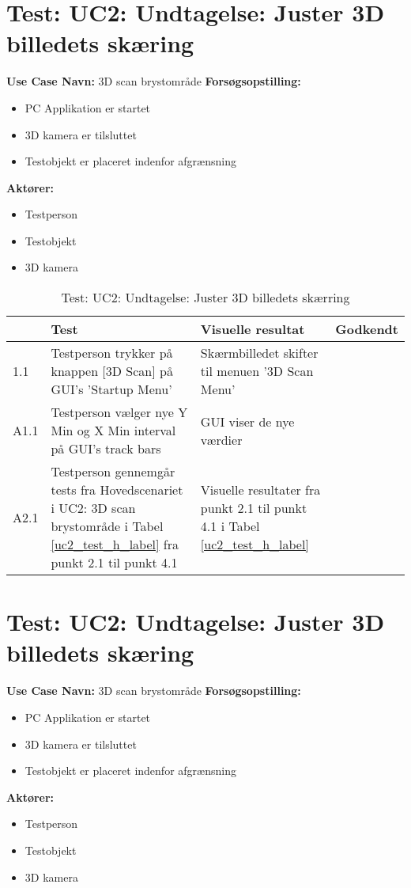 \section{Test: UC2: Undtagelse: Juster 3D billedets skæring}
\textbf{Use Case Navn:} 3D scan brystområde \newline
\textbf{Forsøgsopstilling:}
\begin{itemize}
\item PC Applikation er startet
\item 3D kamera er tilsluttet
\item Testobjekt er placeret indenfor afgrænsning 
\end{itemize}  
\textbf{Aktører:}
\begin{itemize}
\item Testperson
\item Testobjekt
\item 3D kamera
\end{itemize}  

\begin{table}[htb]
\begin{tabularx}{\textwidth}{|p{0.7cm}|X|X|p{2cm}|}
\hline
\textbf{} & \textbf{Test} & \textbf{Visuelle resultat} &\textbf{Godkendt} \\\hline
1.1 & Testperson trykker på knappen [3D Scan] på GUI's 'Startup Menu' & Skærmbilledet skifter til menuen '3D Scan Menu' &  \\\hline
A1.1 & Testperson vælger nye Y Min og X Min interval på GUI's track bars & GUI viser de nye værdier & \\\hline
A2.1 & Testperson gennemgår tests fra Hovedscenariet i UC2: 3D scan brystområde i Tabel \ref{uc2_test_h_label} fra punkt 2.1 til punkt 4.1  & Visuelle resultater fra punkt 2.1 til punkt 4.1 i Tabel  \ref{uc2_test_h_label} & \\\hline
\end{tabularx}
    \caption{Test: UC2: Undtagelse: Juster 3D billedets skærring}
    \label{uc2_test_e_1_label}  
\end{table}
\newpage


\section{Test: UC2: Undtagelse: Juster 3D billedets skæring}
\textbf{Use Case Navn:} 3D scan brystområde \newline
\textbf{Forsøgsopstilling:}
\begin{itemize}
\item PC Applikation er startet
\item 3D kamera er tilsluttet
\item Testobjekt er placeret indenfor afgrænsning 
\end{itemize}  
\textbf{Aktører:}
\begin{itemize}
\item Testperson
\item Testobjekt
\item 3D kamera
\end{itemize}  

